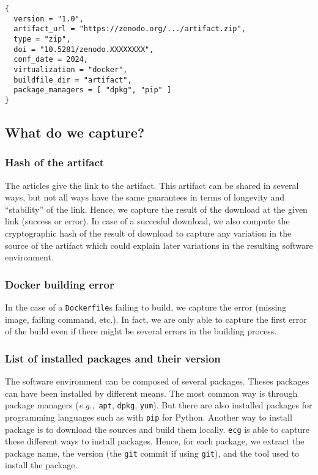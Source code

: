 \documentclass[sigconf,natbib=false]{acmart}
\newcommand{\eg}{\emph{e.g.,}}
\newcommand{\df}{\texttt{Dockerfile}}
\begin{document}
\begin{lstlisting}[caption=Example of Artifact representation in Nickel format.]
{
  version = "1.0",
  artifact_url = "https://zenodo.org/.../artifact.zip",
  type = "zip",
  doi = "10.5281/zenodo.XXXXXXXX",
  conf_date = 2024,
  virtualization = "docker",
  buildfile_dir = "artifact",
  package_managers = [ "dpkg", "pip" ]
}
\end{lstlisting}


\subsection{What do we capture?}

\subsubsection{Hash of the artifact}

The articles give the link to the artifact.
This artifact can be shared in several ways, but not all ways have the same guarantees in terms of longevity and ``stability'' of the link.
Hence, we capture the result of the download at the given link (success or error).
In case of a succesful download, we also compute the cryptographic hash of the result of download to capture any variation in the source of the artifact which could explain later variations in the resulting software environment.

\subsubsection{Docker building error}

In the case of a \df s failing to build, we capture the error (missing image, failing command, etc.).
In fact, we are only able to capture the first error of the build even if there might be several errors in the building process.

\subsubsection{List of installed packages and their version}

The software environment can be composed of several packages.
Theses packages can have been installed by different means.
The most common way is through package managers (\eg\ \texttt{apt}, \texttt{dpkg}, \texttt{yum}).
But there are also installed packages for programming languages such as with \texttt{pip} for Python.
Another way to install package is to download the sources and build them locally.
\texttt{ecg} is able to capture these different ways to install packages.
Hence, for each package, we extract the package name, the version (the \texttt{git} commit if using \texttt{git}), and the tool used to install the package.
\end{document}

